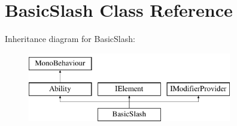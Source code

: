 \hypertarget{class_basic_slash}{}\section{Basic\+Slash Class Reference}
\label{class_basic_slash}
Inheritance diagram for Basic\+Slash\+:\begin{figure}[H]
\begin{center}
\leavevmode
\includegraphics[height=3.000000cm]{class_basic_slash}
\end{center}
\end{figure}
